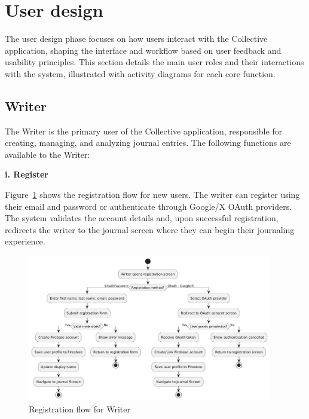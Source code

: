 \section{User design}\label{sec:userDesign}

The user design phase focuses on how users interact with the Collective application, shaping the interface and workflow based on user feedback and usability principles. This section details the main user roles and their interactions with the system, illustrated with activity diagrams for each core function.

\subsection{Writer}\label{subsec:writer}

The Writer is the primary user of the Collective application, responsible for creating, managing, and analyzing journal entries. The following functions are available to the Writer:

\textbf{i. Register}


Figure~\ref{fig:register-flow} shows the registration flow for new users. The writer can register using their email and password or authenticate through Google/X OAuth providers. The system validates the account details and, upon successful registration, redirects the writer to the journal screen where they can begin their journaling experience.

\begin{figure}[H]
\centering
\includegraphics[width=0.95\textwidth,height=0.7\textheight,keepaspectratio]{files/imgs/register_flow.png}
\caption{Registration flow for Writer}
\label{fig:register-flow}
\end{figure}
\clearpage

